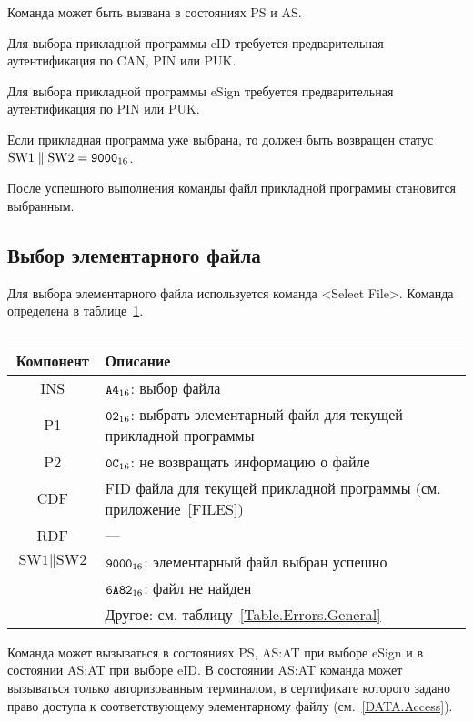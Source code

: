 Команда может быть вызвана в состояниях PS и AS.

Для выбора прикладной программы eID требуется
предварительная аутентификация по CAN, PIN или PUK.

Для выбора прикладной программы eSign требуется
предварительная аутентификация по PIN или PUK.

Если прикладная программа уже выбрана, то должен быть возвращен
статус $\text{SW1} \parallel \text{SW2} = \texttt{9000}_{16}$.

После успешного выполнения команды файл прикладной программы 
становится выбранным.

\subsection{Выбор элементарного файла}
\label{Oper.Descr.SelectEF}

Для выбора элементарного файла используется команда <Select File>. 
Команда определена в таблице~\ref{Table.Oper.SelectEFCmd}.

\begin{table}[hbt]
\caption{}\label{Table.Oper.SelectEFCmd}
\begin{tabular}{|c|p{14cm}|}
\hline
Компонент & Описание \\
\hline
\hline
INS & $\texttt{A4}_{16}$: выбор файла\\ 
\hline
P1 & $\texttt{02}_{16}$: выбрать элементарный файл для текущей прикладной программы\\
\hline
P2 & $\texttt{0C}_{16}$: не возвращать информацию о файле\\
\hline
CDF & FID файла для текущей прикладной программы (см. приложение~\ref{FILES})\\
\hline 
\hline
RDF &  --- \\
\hline
$\text{SW1}\parallel\text{SW2}$ & 
$\texttt{9000}_{16}$: элементарный файл выбран успешно \\
\cline{2-2}
  & $\texttt{6A82}_{16}$: файл не найден \\
\cline{2-2}
  & Другое: см. таблицу~\ref{Table.Errors.General}\\
\hline
\end{tabular}
\end{table}

Команда может вызываться в состояниях PS, AS:AT 
при выборе eSign и в состоянии AS:AT при выборе eID. 
В состоянии AS:AT команда может вызываться только 
авторизованным терминалом, в сертификате которого
задано право доступа к соответствующему элементарному файлу 
(см.~\ref{DATA.Access}).

